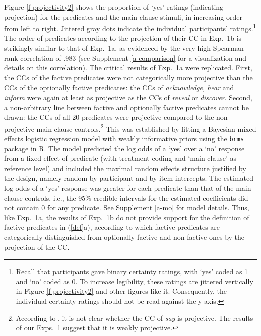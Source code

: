 \documentclass[11pt,fleqn]{article}
\newcommand{\6}{\mbox{$[\hspace*{-.6mm}[$}}
\newcommand{\9}{\mbox{$]\hspace*{-.6mm}]$}}
\begin{document}
Figure \ref{f-projectivity2} shows the proportion of `yes' ratings (indicating projection) for the predicates and the main clause stimuli, in increasing order from left to right. Jittered gray dots indicate the individual participants' ratings.\footnote{Recall that participants gave binary certainty ratings, with `yes' coded as 1 and `no' coded as 0. To increase legibility, these ratings are jittered vertically in Figure \ref{f-projectivity2} and other figures like it. Consequently, the individual certainty ratings should not be read against the y-axis.} The order of predicates according to the projection of their CC in Exp.~1b is strikingly similar to that of Exp.~1a, as evidenced by the very high Spearman rank correlation of .983 (see Supplement \ref{a-comparison} for a visualization and details on this correlation). The critical results of Exp.~1a were replicated. First, the CCs of the factive predicates were not categorically more projective than the CCs of the optionally factive predicates:  the CCs of {\em acknowledge, hear} and {\em inform} were again at least as projective as the CCs of {\em reveal} or {\em discover}. Second, a non-arbitrary line between factive and optionally factive predicates cannot be drawn: the CCs of all 20 predicates were projective compared to the non-projective main clause controls.\footnote{According to \citet[1739]{spector-egre2015}, it is not clear whether the CC of {\em say} is projective. The results of our Exps.~1 suggest that it is weakly projective.}  This was established by fitting a Bayesian mixed effects logistic regression model  with weakly informative priors using the \verb|brms| package in R. The model predicted the log odds of a `yes' over a `no' response from a fixed effect of predicate (with treatment coding and `main clause' as  reference level) and included the maximal random effects structure justified by the design, namely random by-participant and by-item intercepts. The estimated log odds of a `yes' response was greater for each predicate than that of the main clause controls, i.e., the 95\% credible intervals for the estimated coefficients did not contain 0 for any predicate. See Supplement \ref{a-mo} for model details. Thus, like Exp.~1a, the results of Exp.~1b do not provide support for the definition of factive predicates in (\ref{def}a), according to which factive predicates are categorically distinguished from optionally factive and non-factive ones by the projection of the CC.
\end{document}
